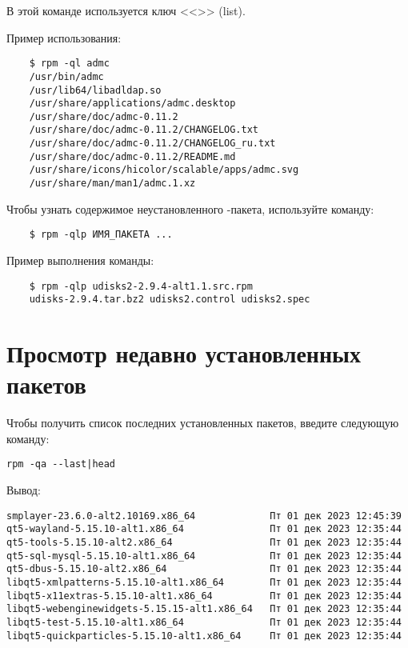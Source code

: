 В этой команде используется ключ <<>> (list).


Пример использования:
\begin{verbatim}
	$ rpm -ql admc 
	/usr/bin/admc 
	/usr/lib64/libadldap.so 
	/usr/share/applications/admc.desktop 
	/usr/share/doc/admc-0.11.2 
	/usr/share/doc/admc-0.11.2/CHANGELOG.txt 
	/usr/share/doc/admc-0.11.2/CHANGELOG_ru.txt 
	/usr/share/doc/admc-0.11.2/README.md 
	/usr/share/icons/hicolor/scalable/apps/admc.svg 
	/usr/share/man/man1/admc.1.xz
\end{verbatim}

Чтобы узнать содержимое неустановленного -пакета, используйте команду:
\begin{verbatim}
	$ rpm -qlp ИМЯ_ПАКЕТА ...
\end{verbatim}

Пример выполнения команды:
\begin{verbatim}
	$ rpm -qlp udisks2-2.9.4-alt1.1.src.rpm
	udisks-2.9.4.tar.bz2 udisks2.control udisks2.spec 
\end{verbatim}

\section{Просмотр недавно установленных пакетов}\label{view-recently-installed-packages}
Чтобы получить список последних установленных пакетов, введите следующую команду: 

\begin{verbatim}
rpm -qa --last|head	
\end{verbatim}

Вывод:
\begin{verbatim}
smplayer-23.6.0-alt2.10169.x86_64             Пт 01 дек 2023 12:45:39
qt5-wayland-5.15.10-alt1.x86_64               Пт 01 дек 2023 12:35:44
qt5-tools-5.15.10-alt2.x86_64                 Пт 01 дек 2023 12:35:44
qt5-sql-mysql-5.15.10-alt1.x86_64             Пт 01 дек 2023 12:35:44
qt5-dbus-5.15.10-alt2.x86_64                  Пт 01 дек 2023 12:35:44
libqt5-xmlpatterns-5.15.10-alt1.x86_64        Пт 01 дек 2023 12:35:44
libqt5-x11extras-5.15.10-alt1.x86_64          Пт 01 дек 2023 12:35:44
libqt5-webenginewidgets-5.15.15-alt1.x86_64   Пт 01 дек 2023 12:35:44
libqt5-test-5.15.10-alt1.x86_64               Пт 01 дек 2023 12:35:44
libqt5-quickparticles-5.15.10-alt1.x86_64     Пт 01 дек 2023 12:35:44
\end{verbatim}

